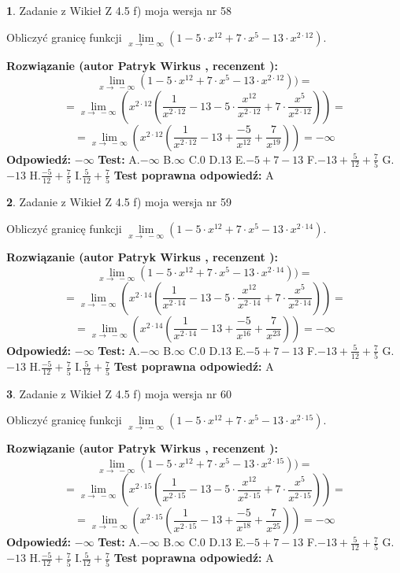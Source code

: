 \documentclass[12pt, a4paper]{article}
\theoremstyle{definition} %
\newtheorem{zad}{}
\newcommand{\zadStart}[1]{\begin{zad}#1\newline}
\newcommand{\zadStop}{\end{zad}}
\newcommand{\rozwStart}[2]{\noindent \textbf{Rozwiązanie (autor #1 , recenzent #2): }\newline}
\newcommand{\rozwStop}{\newline}
\newcommand{\odpStart}{\noindent \textbf{Odpowiedź:}\newline}
\newcommand{\odpStop}{\newline}
\newcommand{\testStart}{\noindent \textbf{Test:}\newline}
\newcommand{\testStop}{\newline}
\newcommand{\kluczStart}{\noindent \textbf{Test poprawna odpowiedź:}\newline}
\newcommand{\kluczStop}{\newline}
\begin{document}
\zadStart{Zadanie z Wikieł Z 4.5 f) moja wersja nr 58}



Obliczyć granicę funkcji  $\lim\limits_{x\to\ -\infty}(1 - 5 \cdot x^{12}+7 \cdot x^{5}- 13 \cdot x^{2\cdot12})$.
\zadStop
\rozwStart{Patryk Wirkus}{}
$$\lim\limits_{x\to\ -\infty}(1 - 5 \cdot x^{12}+7 \cdot x^{5}- 13 \cdot x^{2\cdot12}))=$$
$$=\lim\limits_{x\to\ -\infty}(x^{2\cdot12}(\frac{1}{x^{2\cdot12}}-13 -5 \cdot \frac{x^{12}}{x^{2\cdot12}}+7 \cdot \frac{x^{5}}{x^{2\cdot12}}))=$$
$$=\lim\limits_{x\to\ -\infty}(x^{2\cdot12}(\frac{1}{x^{2\cdot12}}-13 + \frac{-5}{x^{12}}+ \frac{7}{x^{19}}))=-\infty$$
\rozwStop
\odpStart
$-\infty$
\odpStop
\testStart
A.$-\infty$ B.$\infty$ C.$0$ D.$13$ E.$-5 + 7 - 13$
F.$-13+\frac{5}{12}+\frac{7}{5}$ G.$-13$
H.$\frac{-5}{12}+\frac{7}{5}$
I.$\frac{5}{12}+\frac{7}{5}$
\testStop
\kluczStart
A
\kluczStop



\zadStart{Zadanie z Wikieł Z 4.5 f) moja wersja nr 59}



Obliczyć granicę funkcji  $\lim\limits_{x\to\ -\infty}(1 - 5 \cdot x^{12}+7 \cdot x^{5}- 13 \cdot x^{2\cdot14})$.
\zadStop
\rozwStart{Patryk Wirkus}{}
$$\lim\limits_{x\to\ -\infty}(1 - 5 \cdot x^{12}+7 \cdot x^{5}- 13 \cdot x^{2\cdot14}))=$$
$$=\lim\limits_{x\to\ -\infty}(x^{2\cdot14}(\frac{1}{x^{2\cdot14}}-13 -5 \cdot \frac{x^{12}}{x^{2\cdot14}}+7 \cdot \frac{x^{5}}{x^{2\cdot14}}))=$$
$$=\lim\limits_{x\to\ -\infty}(x^{2\cdot14}(\frac{1}{x^{2\cdot14}}-13 + \frac{-5}{x^{16}}+ \frac{7}{x^{23}}))=-\infty$$
\rozwStop
\odpStart
$-\infty$
\odpStop
\testStart
A.$-\infty$ B.$\infty$ C.$0$ D.$13$ E.$-5 + 7 - 13$
F.$-13+\frac{5}{12}+\frac{7}{5}$ G.$-13$
H.$\frac{-5}{12}+\frac{7}{5}$
I.$\frac{5}{12}+\frac{7}{5}$
\testStop
\kluczStart
A
\kluczStop



\zadStart{Zadanie z Wikieł Z 4.5 f) moja wersja nr 60}



Obliczyć granicę funkcji  $\lim\limits_{x\to\ -\infty}(1 - 5 \cdot x^{12}+7 \cdot x^{5}- 13 \cdot x^{2\cdot15})$.
\zadStop
\rozwStart{Patryk Wirkus}{}
$$\lim\limits_{x\to\ -\infty}(1 - 5 \cdot x^{12}+7 \cdot x^{5}- 13 \cdot x^{2\cdot15}))=$$
$$=\lim\limits_{x\to\ -\infty}(x^{2\cdot15}(\frac{1}{x^{2\cdot15}}-13 -5 \cdot \frac{x^{12}}{x^{2\cdot15}}+7 \cdot \frac{x^{5}}{x^{2\cdot15}}))=$$
$$=\lim\limits_{x\to\ -\infty}(x^{2\cdot15}(\frac{1}{x^{2\cdot15}}-13 + \frac{-5}{x^{18}}+ \frac{7}{x^{25}}))=-\infty$$
\rozwStop
\odpStart
$-\infty$
\odpStop
\testStart
A.$-\infty$ B.$\infty$ C.$0$ D.$13$ E.$-5 + 7 - 13$
F.$-13+\frac{5}{12}+\frac{7}{5}$ G.$-13$
H.$\frac{-5}{12}+\frac{7}{5}$
I.$\frac{5}{12}+\frac{7}{5}$
\testStop
\kluczStart
A
\kluczStop
\end{document}
